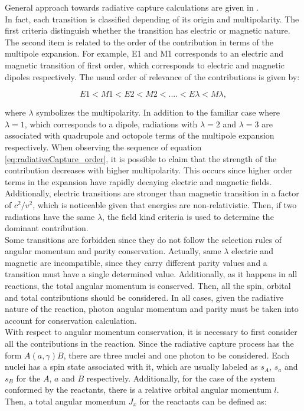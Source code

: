 \documentclass[openany]{book}
\begin{document}
General approach towards radiative capture calculations are given in \cite{goldhaber_weneser_1955}.\\

In fact, each transition is classified depending of its origin and multipolarity. The first criteria distinguish whether the transition has electric or magnetic nature. The second item is related to the order of the contribution in terms of the multipole expansion. For example, E1 and M1 corresponds to an electric and magnetic transition of first order, which corresponds to electric and magnetic dipoles respectively. The usual order of relevance of the contributions is given by: 

\begin{equation}  \label{eq:radiativeCapture_order}
	E1 < M1 < E2 < M2 < .... < E\lambda < M\lambda,
\end{equation}

where $\lambda$ symbolizes the multipolarity. In addition to the familiar case where $\lambda = 1$, which corresponds to a dipole, radiations with $\lambda = 2$ and $\lambda = 3$ are associated with quadrupole and octopole terms of the multipole expansion respectively. When observing the sequence of equation \ref{eq:radiativeCapture_order}, it is possible to claim that the strength of the contribution decreases with higher multipolarity. This occurs since higher order terms in the expansion have rapidly decaying electric and magnetic fields. Additionally, electric transitions are stronger than magnetic transition in a factor of $c^2/v^2$, which is noticeable given that energies are non-relativistic. Then, if two radiations have the same $\lambda$, the field kind criteria is used to determine the dominant contribution. \\

Some transitions are forbidden since they do not follow the selection rules of angular momentum and parity conservation. Actually, same $\lambda$ electric and magnetic are incompatible, since they carry different parity values and a transition must have a single determined value. Additionally, as it happens in all reactions, the total angular momentum is conserved. Then, all the spin, orbital and total  contributions should be considered. In all cases, given the radiative nature of the reaction, photon angular momentum and parity must be taken into account for conservation calculation. \\

With respect to angular momentum conservation, it is necessary to first consider all the contributions in the reaction. Since the radiative capture process has the form $A(a, \gamma)B$, there are three nuclei and one photon to be considered. Each nuclei has a spin state associated with it, which are usually labeled as $s_A$, $s_a$ and $s_B$ for the $A$, $a$ and $B$ respectively. Additionally, for the case of the system conformed by the reactants, there is a relative orbital angular momentum $l$. Then, a total angular momentum $J_x$ for the reactants can be defined as: 
\end{document}

